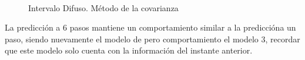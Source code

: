 \documentclass[12pt]{article}
\begin{document}
\begin{figure}
		\centering
		\captionsetup{justification=centering}
		\\
		\caption{Intervalo Difuso. Método de la covarianza}
		\label{f_P2SalidaCov}
\end{figure}

La predicción a 6 pasos mantiene un comportamiento similar a la prediccióna un paso, siendo nuevamente el modelo de pero comportamiento el modelo 3, recordar que este modelo solo cuenta con la información del instante anterior.
\end{document}
